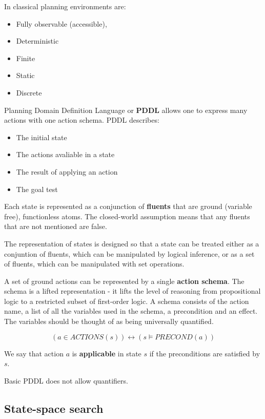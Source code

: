 \documentclass{article}
\begin{document}
In classical planning environments are:
\begin{itemize}
    \item Fully observable (accessible),
    \item Deterministic
    \item Finite
    \item Static 
    \item Discrete 
\end{itemize}

Planning Domain Definition Language or \textbf{PDDL} allows one to express many actions with one action schema.
PDDL describes:
\begin{itemize}
    \item The initial state
    \item The actions avaliable in a state
    \item The result of applying an action
    \item The goal test
\end{itemize}

Each state is represented as a conjunction of \textbf{fluents} that are ground (variable free), functionless atoms. The closed-world assumption means that any fluents that are not mentioned are false. 

The representation of states is designed so that a state can be treated either as a conjuntion of fluents, which can be manipulated by logical inference, or as a set of fluents, which can be manipulated with set operations. 


A set of ground  actions can be represented by a single \textbf{action schema}. The schema is a lifted representation - it lifts the level of reasoning from propositional logic to a restricted subset of first-order logic. A schema consists of the action name, a list of all the variables used in the schema, a precondition and an effect. The variables should be thought of as being universally quantified. 

$$(a \in ACTIONS(s)) \leftrightarrow (s \vDash PRECOND(a))$$

We say that action $a$ is \textbf{applicable} in state $s$ if the preconditions are satisfied by $s$. \newline

Basic PDDL does not allow quantifiers. 

\subsection{State-space search}
\end{document}

